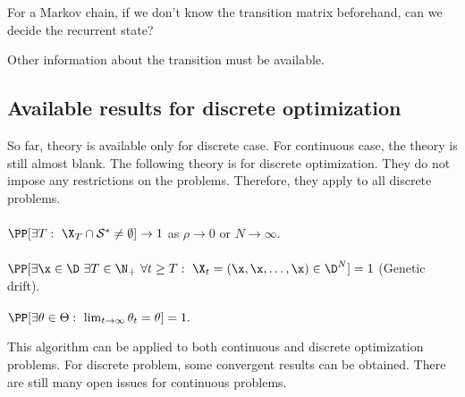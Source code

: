 \begin{ques}
      For a Markov chain, if we don't know the transition matrix beforehand, can we decide the recurrent state?
\end{ques}
\begin{answ}
      Other information about the transition must be available.
\end{answ}

    \subsection[Results]{Available results for discrete optimization}

    	So far, theory is available only for discrete case. For continuous case, the
    	theory is still almost blank. The following theory is for discrete optimization.
    	They do not impose any restrictions on the problems. Therefore, they apply to
    	all discrete problems.\\[1ex]
    	\\[1ex]
    	$\PP [\exists T:\ \X_T \cap \mathcal{S}^*\neq \emptyset]\to 1$ as $\rho \to 0$ or $N\to \infty.$\\[2ex]
    	\\[1ex]
    	$\PP [\exists \x \in \D\ \exists T\in \N_+\ \forall t\ge T:\ \X_t=(\x, \x,\ldots, \x)\in \D^{N}]=1$ (Genetic drift).\\[2ex]
    	\\[1ex]
    	$\PP [\exists \theta\in \Theta:\ \lim_{t\to \infty} \theta_t =\theta]=1.$

\begin{note}
      This algorithm can be applied to both continuous and discrete optimization problems. 
      For discrete problem, some convergent results can be obtained.
      There are still many open issues for continuous problems.
\end{note}

